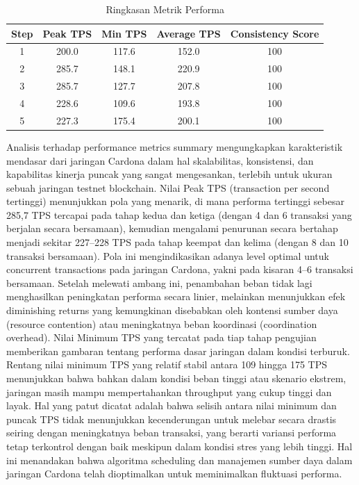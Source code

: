 \begin{table}[h!]
  \centering
  \begin{tabular}{|c|c|c|c|c|}
    \hline
    \textbf{Step} & \textbf{Peak TPS} & \textbf{Min TPS} & \textbf{Average TPS} & \textbf{Consistency Score} \\
    \hline
    1             & 200.0             & 117.6            & 152.0                & 100                        \\
    \hline
    2             & 285.7             & 148.1            & 220.9                & 100                        \\
    \hline
    3             & 285.7             & 127.7            & 207.8                & 100                        \\
    \hline
    4             & 228.6             & 109.6            & 193.8                & 100                        \\
    \hline
    5             & 227.3             & 175.4            & 200.1                & 100                        \\
    \hline
  \end{tabular}
  \caption{Ringkasan Metrik Performa}
  \label{tab:performance_metrics}
\end{table}

Analisis terhadap performance metrics summary mengungkapkan karakteristik
mendasar dari jaringan Cardona dalam hal skalabilitas, konsistensi, dan
kapabilitas kinerja puncak yang sangat mengesankan, terlebih untuk ukuran
sebuah jaringan testnet blockchain. Nilai Peak TPS (transaction per second
tertinggi) menunjukkan pola yang menarik, di mana performa tertinggi sebesar
285,7 TPS tercapai pada tahap kedua dan ketiga (dengan 4 dan 6 transaksi yang
berjalan secara bersamaan), kemudian mengalami penurunan secara bertahap
menjadi sekitar 227–228 TPS pada tahap keempat dan kelima (dengan 8 dan 10
transaksi bersamaan). Pola ini mengindikasikan adanya level optimal untuk
concurrent transactions pada jaringan Cardona, yakni pada kisaran 4–6 transaksi
bersamaan. Setelah melewati ambang ini, penambahan beban tidak lagi
menghasilkan peningkatan performa secara linier, melainkan menunjukkan efek
diminishing returns yang kemungkinan disebabkan oleh kontensi sumber daya
(resource contention) atau meningkatnya beban koordinasi (coordination
overhead). Nilai Minimum TPS yang tercatat pada tiap tahap pengujian memberikan
gambaran tentang performa dasar jaringan dalam kondisi terburuk. Rentang nilai
minimum TPS yang relatif stabil antara 109 hingga 175 TPS menunjukkan bahwa
bahkan dalam kondisi beban tinggi atau skenario ekstrem, jaringan masih mampu
mempertahankan throughput yang cukup tinggi dan layak. Hal yang patut dicatat
adalah bahwa selisih antara nilai minimum dan puncak TPS tidak menunjukkan
kecenderungan untuk melebar secara drastis seiring dengan meningkatnya beban
transaksi, yang berarti variansi performa tetap terkontrol dengan baik meskipun
dalam kondisi stres yang lebih tinggi. Hal ini menandakan bahwa algoritma
scheduling dan manajemen sumber daya dalam jaringan Cardona telah dioptimalkan
untuk meminimalkan fluktuasi performa.

